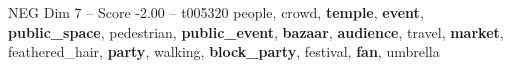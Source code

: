 \begin{textsample}{NEG Dim 7 – Score -2.00 – t005320}  \label{ex:f7_neg_002}
people, crowd, \textbf{temple}, \textbf{event}, \textbf{public\_space}, pedestrian, \textbf{public\_event}, \textbf{bazaar}, \textbf{audience}, travel, \textbf{market}, feathered\_hair, \textbf{party}, walking, \textbf{block\_party}, festival, \textbf{fan}, umbrella

\end{textsample}
